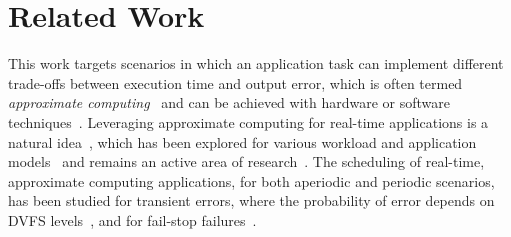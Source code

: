 \chapter{Related Work}
\label{sec:related}



This work targets scenarios in which an application task can implement
different trade-offs between execution time and output error, which is
often termed \emph{approximate computing}~\cite{7348659} and can be
achieved with hardware or software
techniques~\cite{10.1145/3716845,10.1145/3711683}.  Leveraging approximate
computing for real-time applications is a natural idea~\cite{259428,
Leung1995}, which has been explored for various workload and application
models~\cite{10.1002/cpe.4208, 10.1016/j.future.2019.02.019,
STAVRINIDES20101004, 585499, 10.1007/978-3-642-21713-5_20} and remains an
active area of research~\cite{10.1145/3589950}.  The scheduling of
real-time, approximate computing applications, for both aperiodic and
periodic scenarios, has been studied for transient errors, where the
probability of error depends on DVFS levels~\cite{10.1145/2442087.2442094,
10.1007/s11227-021-03764-x}, and for fail-stop failures~\cite{259428,
10.1177/0037549709340729, 10.1109/TC.2003.1183950, 7570524}.


